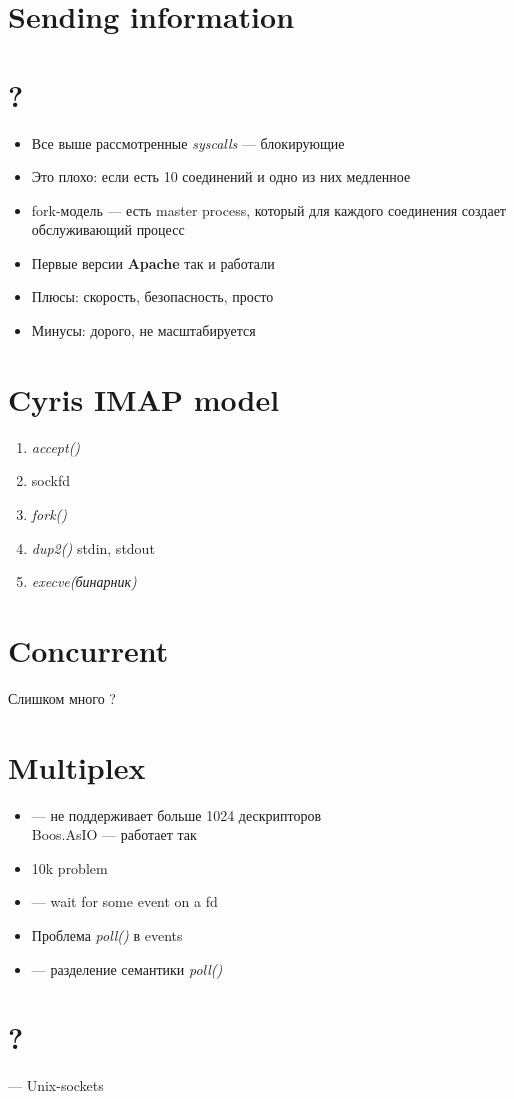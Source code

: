 \section{Sending information}

\section{?}
\begin{itemize}
    \item Все выше рассмотренные \emph{syscalls} --- блокирующие
    \item Это плохо: если есть 10 соединений и одно из них медленное
    \item fork-модель --- есть master process, который для каждого соединения
          создает обслуживающий процесс
    \item Первые версии \textbf{Apache} так и работали
    \item Плюсы: скорость, безопасность, просто
    \item Минусы: дорого, не масштабируется
\end{itemize}

\section{Cyris IMAP model}
\begin{enumerate}
    \item \emph{accept()}
    \item sockfd
    \item \emph{fork()}
    \item \emph{dup2()} stdin, stdout
    \item \emph{execve(бинарник)}
\end{enumerate}

\section{Concurrent}
Слишком много ?

\section{Multiplex}
\begin{itemize}
    \item {} --- не поддерживает больше 1024 дескрипторов\\
          Boos.AsIO --- работает так
    \item 10k problem
    \item {} --- wait for some event on a fd
    \item Проблема \emph{poll()} в events
    \item {} --- разделение семантики \emph{poll()}
\end{itemize}

\section{?}
 --- Unix-sockets
